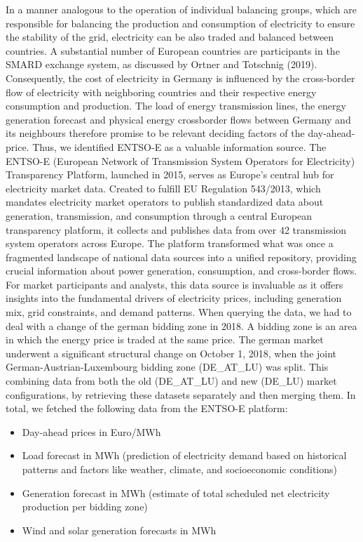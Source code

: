 \documentclass[a4paper]{article}
\providecommand{\tightlist}{%
      \setlength{\itemsep}{0pt}\setlength{\parskip}{0pt}}
\begin{document}
In a manner analogous to the operation of individual balancing groups,
which are responsible for balancing the production and consumption of
electricity to ensure the stability of the grid, electricity can be also
traded and balanced between countries. A substantial number of European
countries are participants in the SMARD exchange system, as discussed by
Ortner and Totschnig (2019). Consequently, the cost of electricity in
Germany is influenced by the cross-border flow of electricity with
neighboring countries and their respective energy consumption and
production. The load of energy transmission lines, the energy generation
forecast and physical energy crossborder flows between Germany and its
neighbours therefore promise to be relevant deciding factors of the
day-ahead-price. Thus, we identified ENTSO-E as a valuable information
source. The ENTSO-E (European Network of Transmission System Operators
for Electricity) Transparency Platform, launched in 2015, serves as
Europe's central hub for electricity market data. Created to fulfill EU
Regulation 543/2013, which mandates electricity market operators to
publish standardized data about generation, transmission, and
consumption through a central European transparency platform, it
collects and publishes data from over 42 transmission system operators
across Europe. The platform transformed what was once a fragmented
landscape of national data sources into a unified repository, providing
crucial information about power generation, consumption, and
cross-border flows. For market participants and analysts, this data
source is invaluable as it offers insights into the fundamental drivers
of electricity prices, including generation mix, grid constraints, and
demand patterns. When querying the data, we had to deal with a change of
the german bidding zone in 2018. A bidding zone is an area in which the
energy price is traded at the same price. The german market underwent a
significant structural change on October 1, 2018, when the joint
German-Austrian-Luxembourg bidding zone (DE\_AT\_LU) was split. This
combining data from both the old (DE\_AT\_LU) and new (DE\_LU) market
configurations, by retrieving these datasets separately and then merging
them. In total, we fetched the following data from the ENTSO-E platform:

    \begin{itemize}
\tightlist
\item
  Day-ahead prices in Euro/MWh
\item
  Load forecast in MWh (prediction of electricity demand based on
  historical patterns and factors like weather, climate, and
  socioeconomic conditions)
\item
  Generation forecast in MWh (estimate of total scheduled net
  electricity production per bidding zone)
\item
  Wind and solar generation forecasts in MWh
\end{itemize}
\end{document}
